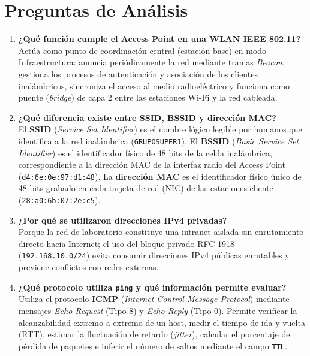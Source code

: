 \documentclass[11pt, a4paper]{article}
\begin{document}
\section{Preguntas de Análisis}

\begin{enumerate}
    \item \textbf{¿Qué función cumple el Access Point en una WLAN IEEE 802.11?} \\
    Actúa como punto de coordinación central (estación base) en modo Infraestructura: anuncia periódicamente la red mediante tramas \textit{Beacon}, gestiona los procesos de autenticación y asociación de los clientes inalámbricos, sincroniza el acceso al medio radioeléctrico y funciona como puente (\textit{bridge}) de capa 2 entre las estaciones Wi-Fi y la red cableada.
    \item \textbf{¿Qué diferencia existe entre SSID, BSSID y dirección MAC?} \\
    El \textbf{SSID} (\textit{Service Set Identifier}) es el nombre lógico legible por humanos que identifica a la red inalámbrica (\texttt{GRUPOSUPER1}). El \textbf{BSSID} (\textit{Basic Service Set Identifier}) es el identificador físico de 48 bits de la celda inalámbrica, correspondiente a la dirección MAC de la interfaz radio del Access Point (\texttt{d4:6e:0e:97:d1:48}). La \textbf{dirección MAC} es el identificador físico único de 48 bits grabado en cada tarjeta de red (NIC) de las estaciones cliente (\texttt{28:a0:6b:07:2e:c5}).
    \item \textbf{¿Por qué se utilizaron direcciones IPv4 privadas?} \\
    Porque la red de laboratorio constituye una intranet aislada sin enrutamiento directo hacia Internet; el uso del bloque privado RFC 1918 (\texttt{192.168.10.0/24}) evita consumir direcciones IPv4 públicas enrutables y previene conflictos con redes externas.
    \item \textbf{¿Qué protocolo utiliza \texttt{ping} y qué información permite evaluar?} \\
    Utiliza el protocolo \textbf{ICMP} (\textit{Internet Control Message Protocol}) mediante mensajes \textit{Echo Request} (Tipo 8) y \textit{Echo Reply} (Tipo 0). Permite verificar la alcanzabilidad extremo a extremo de un host, medir el tiempo de ida y vuelta (RTT), estimar la fluctuación de retardo (\textit{jitter}), calcular el porcentaje de pérdida de paquetes e inferir el número de saltos mediante el campo \texttt{TTL}.

\end{enumerate}
\end{document}

